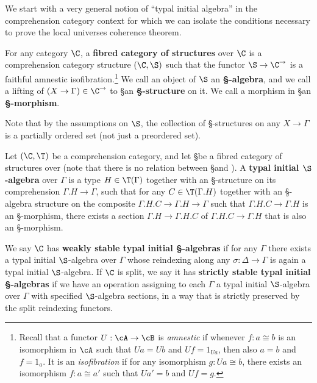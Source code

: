 \begin{enumerate}
We start with a very general notion of ``typal initial algebra'' in the comprehension category context for which we can isolate the conditions necessary to prove the local universes coherence theorem.

\begin{defn}
  For any category $\C$, a \textbf{fibred category of structures} over $\C$ is a comprehension category structure $(\C,\S)$ such that the functor $\S\to\C^\to$ is a faithful amnestic isofibration.\footnote{Recall that a functor $U:\cA\to\cB$ is \emph{amnestic} if whenever $f:a\cong b$ is an isomorphism in $\cA$ such that $U a = U b$ and $U f = 1_{U a}$, then also $a = b$ and $f = 1_a$.
  It is an \emph{isofibration} if for any isomorphism $g:U a \cong b$, there exists an isomorphism $f:a\cong a'$ such that $U a' = b$ and $U f = g$.}
  We call an object of $\S$ an \textbf{\S-algebra}, and we call a lifting of $(X\to \Gamma)\in\C^\to$ to \S an \textbf{\S-structure} on it.
  We call a morphism in \S an \textbf{\S-morphism}.
\end{defn}

Note that by the assumptions on $\S$, the collection of \S-structures on any $X\to \Gamma$ is a partially ordered set (not just a preordered set).

\begin{defn}
  Let $(\C,\T)$ be a comprehension category, and let \S be a fibred category of structures over \C (note that there is no relation between \S and \T).
  A \textbf{typal initial $\S$-algebra} over $\Gamma$ is a type $H\in \T(\Gamma)$ together with an \S-structure on its comprehension $\Gamma.H\to\Gamma$, such that for any $C\in\T(\Gamma.H)$ together with an \S-algebra structure on the composite $\Gamma.H.C\to\Gamma.H\to\Gamma$ such that $\Gamma.H.C\to\Gamma.H$ is an \S-morphism, there exists a section $\Gamma.H \to \Gamma.H.C$ of $\Gamma.H.C\to\Gamma.H$ that is also an \S-morphism.

  We say $\C$ has \textbf{weakly stable typal initial \S-algebras} if for any $\Gamma$ there exists a typal initial $\S$-algebra over $\Gamma$ whose reindexing along any $\sigma:\Delta\to\Gamma$ is again a typal initial $\S$-algebra.
  If $\C$ is split, we say it has \textbf{strictly stable typal initial \S-algebras} if we have an operation assigning to each $\Gamma$ a typal initial $\S$-algebra over $\Gamma$ with specified $\S$-algebra sections, in a way that is strictly preserved by the split reindexing functors.
\end{defn}


\end{enumerate}
